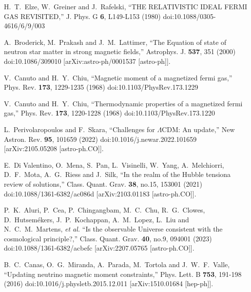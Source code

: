 \documentclass[universe,article,submit,moreauthors,pdftex,a4paper]{Definitions/mdpi}
\begin{document}
\begin{thebibliography}{99}
H.~T.~Elze, W.~Greiner and J.~Rafelski,
``THE RELATIVISTIC IDEAL FERMI GAS REVISITED,''
J. Phys. G \textbf{6}, L149-L153 (1980)
doi:10.1088/0305-4616/6/9/003

A.~Broderick, M.~Prakash and J.~M.~Lattimer,
``The Equation of state of neutron star matter in strong magnetic fields,''
Astrophys. J. \textbf{537}, 351 (2000)
doi:10.1086/309010
[arXiv:astro-ph/0001537 [astro-ph]].

V.~Canuto and H.~Y.~Chiu,
``Magnetic moment of a magnetized fermi gas,''
Phys. Rev. \textbf{173}, 1229-1235 (1968)
doi:10.1103/PhysRev.173.1229

V.~Canuto and H.~Y.~Chiu,
``Thermodynamic properties of a magnetized fermi gas,''
Phys. Rev. \textbf{173}, 1220-1228 (1968)
doi:10.1103/PhysRev.173.1220

L.~Perivolaropoulos and F.~Skara,
``Challenges for \ensuremath{\Lambda}CDM: An update,''
New Astron. Rev. \textbf{95}, 101659 (2022)
doi:10.1016/j.newar.2022.101659
[arXiv:2105.05208 [astro-ph.CO]].

E.~Di Valentino, O.~Mena, S.~Pan, L.~Visinelli, W.~Yang, A.~Melchiorri, D.~F.~Mota, A.~G.~Riess and J.~Silk,
``In the realm of the Hubble tension\textemdash{}a review of solutions,''
Class. Quant. Grav. \textbf{38}, no.15, 153001 (2021)
doi:10.1088/1361-6382/ac086d
[arXiv:2103.01183 [astro-ph.CO]].

P.~K.~Aluri, P.~Cea, P.~Chingangbam, M.~C.~Chu, R.~G.~Clowes, D.~Hutsem\'ekers, J.~P.~Kochappan, A.~M.~Lopez, L.~Liu and N.~C.~M.~Martens, \textit{et al.}
``Is the observable Universe consistent with the cosmological principle?,''
Class. Quant. Grav. \textbf{40}, no.9, 094001 (2023)
doi:10.1088/1361-6382/acbefc
[arXiv:2207.05765 [astro-ph.CO]].

B.~C.~Canas, O.~G.~Miranda, A.~Parada, M.~Tortola and J.~W.~F.~Valle,
``Updating neutrino magnetic moment constraints,''
Phys. Lett. B \textbf{753}, 191-198 (2016)
doi:10.1016/j.physletb.2015.12.011
[arXiv:1510.01684 [hep-ph]].


\end{thebibliography}
\end{document}
